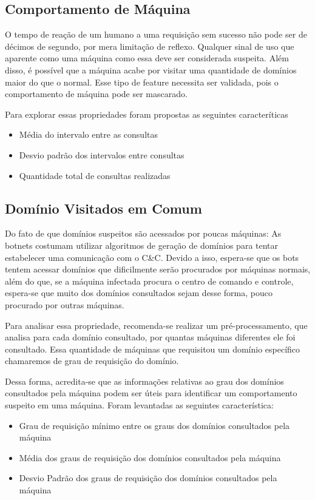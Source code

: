 \subsection{Comportamento de Máquina}

O tempo de reação de um humano a uma requisição sem sucesso não pode ser de décimos de segundo, por mera limitação de reflexo. Qualquer sinal de uso que aparente como uma máquina como essa deve ser considerada suspeita. Além disso, é possível que a máquina acabe por visitar uma quantidade de domínios maior do que o normal. Esse tipo de feature necessita ser validada, pois o comportamento de máquina pode ser mascarado.

Para explorar essas propriedades foram propostas as seguintes caracteríticas

\begin{itemize}
\item Média do intervalo entre as consultas
\item Desvio padrão dos intervalos entre consultas
\item Quantidade total de consultas realizadas
\end{itemize}

\subsection{Domínio Visitados em Comum}
Do fato de que domínios suspeitos são acessados por poucas máquinas: As botnets costumam utilizar algoritmos de geração de domínios para tentar estabelecer uma comunicação com o C\&C. Devido a isso, espera-se que os bots tentem acessar domínios que dificilmente serão procurados por máquinas normais, além do que, se a máquina infectada procura o centro de comando e controle, espera-se que muito dos domínios consultados sejam desse forma, pouco procurado por outras máquinas.

Para analisar essa propriedade, recomenda-se realizar um pré-processamento, que analisa para cada domínio consultado, por quantas máquinas diferentes ele foi consultado. Essa quantidade de máquinas que requisitou um domínio específico chamaremos de grau de requisição do domínio.

Dessa forma, acredita-se que as informações relativas ao grau dos domínios consultados pela máquina podem ser úteis para identificar um comportamento suspeito em uma máquina. Foram levantadas as seguintes característica:

\begin{itemize}
\item Grau de requisição mínimo entre os graus dos domínios consultados pela máquina
\item Média dos graus de requisição dos domínios consultados pela máquina
\item Desvio Padrão dos graus de requisição dos domínios consultados pela máquina

\end{itemize}

